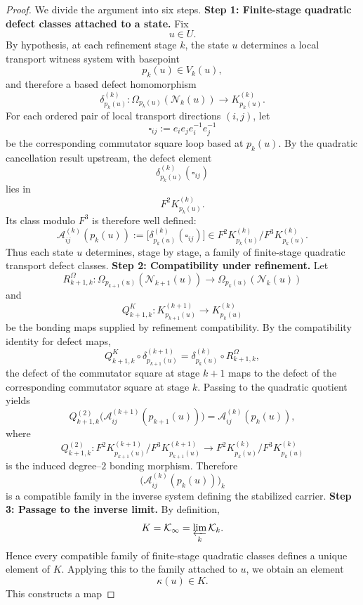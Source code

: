 \begin{proof}
	We divide the argument into six steps.
	\medskip
	\noindent
	\textbf{Step 1: Finite-stage quadratic defect classes attached to a state.}
	Fix
	\[
		u\in U.
	\]
	By hypothesis, at each refinement stage \(k\), the state \(u\) determines
	a local transport witness system with basepoint
	\[
		p_k(u)\in V_k(u),
	\]
	and therefore a based defect homomorphism
	\[
		\delta_{p_k(u)}^{(k)}:
		\Omega_{p_k(u)}(\mathcal N_k(u))\to K_{p_k(u)}^{(k)}.
	\]
	For each ordered pair of local transport directions \((i,j)\), let
	\[
		\square_{ij}:=e_ie_je_i^{-1}e_j^{-1}
	\]
	be the corresponding commutator square loop based at \(p_k(u)\).
	By the quadratic cancellation result upstream, the defect element
	\[
		\delta_{p_k(u)}^{(k)}(\square_{ij})
	\]
	lies in
	\[
		F^2K_{p_k(u)}^{(k)}.
	\]
	Its class modulo \(F^3\) is therefore well defined:
	\[
		\mathcal A_{ij}^{(k)}(p_k(u))
		:=
		\bigl[\delta_{p_k(u)}^{(k)}(\square_{ij})\bigr]
		\in
		F^2K_{p_k(u)}^{(k)}/F^3K_{p_k(u)}^{(k)}.
	\]
	Thus each state \(u\) determines, stage by stage, a family of
	finite-stage quadratic transport defect classes.
	\medskip
	\noindent
	\textbf{Step 2: Compatibility under refinement.}
	Let
	\[
		R_{k+1,k}^{\Omega}:
		\Omega_{p_{k+1}(u)}(\mathcal N_{k+1}(u))
		\to
		\Omega_{p_k(u)}(\mathcal N_k(u))
	\]
	and
	\[
		Q_{k+1,k}^{K}:
		K_{p_{k+1}(u)}^{(k+1)}
		\to
		K_{p_k(u)}^{(k)}
	\]
	be the bonding maps supplied by refinement compatibility.
	By the compatibility identity for defect maps,
	\[
		Q_{k+1,k}^{K}\circ \delta_{p_{k+1}(u)}^{(k+1)}
		=
		\delta_{p_k(u)}^{(k)}\circ R_{k+1,k}^{\Omega},
	\]
	the defect of the commutator square at stage \(k+1\) maps to the defect
	of the corresponding commutator square at stage \(k\).
	Passing to the quadratic quotient yields
	\[
		Q_{k+1,k}^{(2)}
		\bigl(\mathcal A_{ij}^{(k+1)}(p_{k+1}(u))\bigr)
		=
		\mathcal A_{ij}^{(k)}(p_k(u)),
	\]
	where
	\[
		Q_{k+1,k}^{(2)}:
		F^2K_{p_{k+1}(u)}^{(k+1)}/F^3K_{p_{k+1}(u)}^{(k+1)}
		\to
		F^2K_{p_k(u)}^{(k)}/F^3K_{p_k(u)}^{(k)}
	\]
	is the induced degree--\(2\) bonding morphism.
	Therefore
	\[
		\bigl(\mathcal A_{ij}^{(k)}(p_k(u))\bigr)_k
	\]
	is a compatible family in the inverse system defining the stabilized
	carrier.
	\medskip
	\noindent
	\textbf{Step 3: Passage to the inverse limit.}
	By definition,
	\[
		K=\mathcal K_\infty=\varprojlim_k \mathcal K_k.
	\]
	Hence every compatible family of finite-stage quadratic classes defines a
	unique element of \(K\).
	Applying this to the family attached to \(u\), we obtain an element
	\[
		\kappa(u)\in K.
	\]
	This constructs a map

\end{proof}
